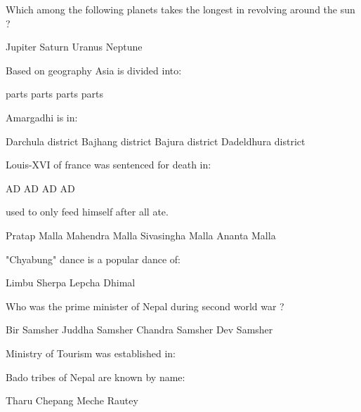 \begin{questions}
\question Which among the following planets takes the longest in revolving around the sun ?
  \begin{choices}
  \choice Jupiter
  \choice Saturn
  \choice Uranus
  \CorrectChoice Neptune
  \end{choices}

\question Based on geography Asia is divided into:
  \begin{choices}
   parts
   parts
   parts
   parts
  \end{choices}

\question Amargadhi is in:
  \begin{choices}
  \choice Darchula district
  \choice Bajhang district
  \choice Bajura district
  \CorrectChoice Dadeldhura district
  \end{choices}

\question Louis-XVI of france was sentenced for death in:
  \begin{choices}
   AD
   AD
   AD
   AD
  \end{choices}

\question \fillin[][2cm] used to only feed himself after all ate.
  \begin{choices}
  \choice Pratap Malla
  \CorrectChoice Mahendra Malla
  \choice Sivasingha Malla
  \choice Ananta Malla
  \end{choices}

\question "Chyabung" dance is a popular dance of:
  \begin{choices}
  \CorrectChoice Limbu
  \choice Sherpa
  \choice Lepcha
  \choice Dhimal
  \end{choices}

\question Who was the prime minister of Nepal during second world war ?
  \begin{choices}
  \choice Bir Samsher
  \choice Juddha Samsher
  \CorrectChoice Chandra Samsher
  \choice Dev Samsher
  \end{choices}

\question Ministry of Tourism was established in:
  \begin{choices}
  \end{choices}

\question Bado tribes of Nepal are known by name:
  \begin{choices}
  \choice Tharu
  \choice Chepang
  \CorrectChoice Meche
  \choice Rautey
  \end{choices}


\end{questions}
